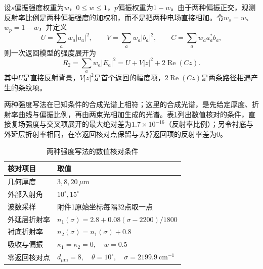 设$s$偏振强度权重为$w$，$0\leq w\leq1$，$p$偏振权重为$1-w$。由于两种偏振正交，观测反射率比例是两种偏振强度的加权和，而不是把两种电场直接相加。令$w_s=w$、$w_p=1-w$，并定义
\begin{equation}
U=\sum_a w_a|a_a|^2,\qquad V=\sum_a w_a|b_a|^2,\qquad C=\sum_a w_a a_a^*b_a,
\end{equation}
则一次返回模型的强度展开为
\begin{equation}
R_2=\sum_a w_a|E_a|^2=U+V|z|^2+2\operatorname{Re}(Cz).
\end{equation}
其中$U$是直接反射背景，$V|z|^2$是首个返回的幅度项，$2\operatorname{Re}(Cz)$是两条路径相遇产生的条纹项。

两种强度写法在已知条件的合成光谱上相符；这里的合成光谱，是先给定厚度、折射率曲线与偏振比例，再由两束光相加生成的光谱。表\ref{tab:field-check-conditions}列出数值核对的条件，直接复场强度与交叉项展开的最大绝对差为$1.7\times10^{-16}$（反射率比例）；另令衬底与外延层折射率相同，在零返回核对点保留与去掉返回项的反射率差为$0$。

\begingroup
\setlength{\tabcolsep}{0.01\textwidth}
\begin{longtable}{>{\centering\arraybackslash}p{}>{\centering\arraybackslash}p{}}
  \caption{两种强度写法的数值核对条件}\label{tab:field-check-conditions}\\
  \toprule
  核对项目 & 取值 \\
  \midrule
  几何厚度 & $3,8,20\ \mu\mathrm{m}$ \\
  外部入射角 & $10^\circ,15^\circ$ \\
  波数采样 & 附件1原始坐标每隔$32$点取一点 \\
  外延层折射率 & $n_1(\sigma)=2.8+0.08(\sigma-2200)/1800$ \\
  衬底折射率 & $n_2(\sigma)=n_1(\sigma)+0.8$ \\
  吸收与偏振 & $\kappa_1=\kappa_2=0,\quad w=0.5$ \\
  零返回核对点 & $d_{\mu\mathrm{m}}=8,\quad\theta=10^\circ,\quad\sigma=2199.9\ \mathrm{cm}^{-1}$ \\
  \bottomrule
\end{longtable}
\endgroup

